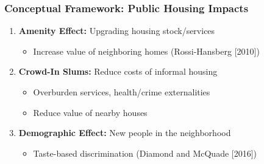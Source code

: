 \documentclass[aspectratio=149]{beamer}
\begin{document}
\begin{frame}
\frametitle{Conceptual Framework: Public Housing Impacts}

\begin{enumerate}
  \item \textbf{Amenity Effect:} Upgrading housing stock/services
    \begin{itemize}
        \item Increase value of neighboring homes (Rossi-Hansberg [2010])
    \end{itemize}
\vspace{.2cm} 

  \item \textbf{Crowd-In Slums:} Reduce costs of informal housing
    \begin{itemize}
        \item Overburden services, health/crime externalities
        \item Reduce value of nearby houses
    \end{itemize}
\vspace{.2cm}

  \item \textbf{Demographic Effect:} New people in the neighborhood
    \begin{itemize}
        \item Taste-based discrimination (Diamond and McQuade [2016])
    \end{itemize}
\end{enumerate}


\end{frame}
\end{document}
